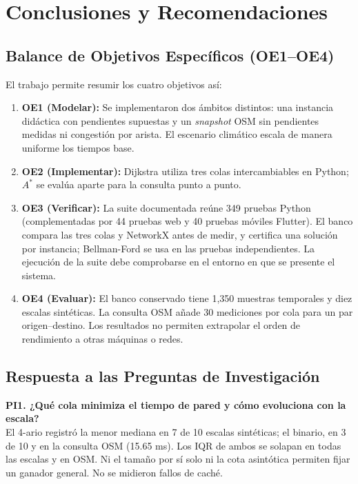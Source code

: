 \section{Conclusiones y Recomendaciones}
\label{sec:conclusiones}

\subsection*{Balance de Objetivos Específicos (OE1--OE4)}
El trabajo permite resumir los cuatro objetivos así:
\begin{enumerate}
    \item \textbf{OE1 (Modelar):} Se implementaron dos ámbitos distintos: una instancia didáctica con pendientes supuestas y un \textit{snapshot} OSM sin pendientes medidas ni congestión por arista. El escenario climático escala de manera uniforme los tiempos base.
    \item \textbf{OE2 (Implementar):} Dijkstra utiliza tres colas intercambiables en Python; $A^*$ se evalúa aparte para la consulta punto a punto.
    \item \textbf{OE3 (Verificar):} La suite documentada reúne 349 pruebas Python (complementadas por 44 pruebas web y 40 pruebas móviles Flutter). El banco compara las tres colas y NetworkX antes de medir, y certifica una solución por instancia; Bellman-Ford se usa en las pruebas independientes. La ejecución de la suite debe comprobarse en el entorno en que se presente el sistema.
    \item \textbf{OE4 (Evaluar):} El banco conservado tiene 1,350 muestras temporales y diez escalas sintéticas. La consulta OSM añade 30 mediciones por cola para un par origen--destino. Los resultados no permiten extrapolar el orden de rendimiento a otras máquinas o redes.
\end{enumerate}

\subsection*{Respuesta a las Preguntas de Investigación}
\noindent\textbf{PI1. ¿Qué cola minimiza el tiempo de pared y cómo evoluciona con la escala?}\\[0.15cm]
El 4-ario registró la menor mediana en 7 de 10 escalas sintéticas; el binario, en 3 de 10 y en la consulta OSM (15.65 ms). Los IQR de ambos se solapan en todas las escalas y en OSM. Ni el tamaño por sí solo ni la cota asintótica permiten fijar un ganador general. No se midieron fallos de caché.

